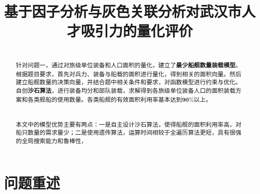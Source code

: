 \documentclass{whutmod}
\title{基于因子分析与灰色关联分析对武汉市人才吸引力的量化评价}
\begin{document}
	
	\begin{abstract}

~\\

针对问题一，通过对旅级单位装备和人口面积的量化，建立了\textbf{最少船舰数量装载模型}。根据题目要求，首先对兵力、装备与船载的面积进行量化，得到相关的面积向量。然后建立船舰数量的决策向量，并结合题中相关条件和要求，对函数模型进行约束与优化。自创\textbf{沙石算法}，进行装备均分和部队装载，求解得到各旅级单位装备人口的面积装载方案和各类舰船的使用数量。各类船舰的有效面积利用率基本达到$\textbf{90\%}$以上。
~\\


~\\

~\\

本文中的模型优势主要有两点：一是自主设计沙石算法，使得船舰的面积利用率高，对船只数量的需求量少；二是使用遗传算法，运算时间相较于全遍历算法更短，具有很强的全局搜索能力和鲁棒性，
	
  
		
	\end{abstract}
	
	\tableofcontents
	\newpage	%
	
	\section{问题重述}	
\end{document}
